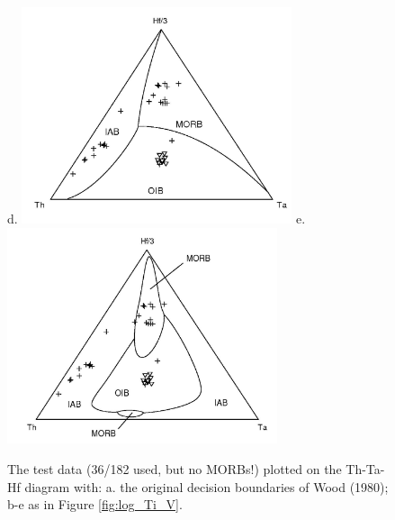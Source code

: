 \begin{figure}[htbp]
d.  \includegraphics[width=300]{figures/test_Th_Ta_Hf_lin.jpg}
e.  \includegraphics[width=300]{figures/test_Th_Ta_Hf_q.jpg}
  \caption[The test data plotted on the Th-Ta-Hf diagram]
{The test  data (36/182 used, but  no MORBs!) plotted  on the Th-Ta-Hf
diagram with: a. the original  decision boundaries of Wood (1980); b-e
as in Figure \ref{fig:log_Ti_V}.}
  \label{fig:log_Th_Ta_Hf}
\end{figure}

